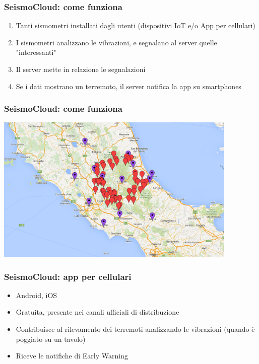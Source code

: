 \begin{frame}
	\frametitle{SeismoCloud: come funziona}
	
	\begin{enumerate}
		\item<1-> Tanti sismometri installati dagli utenti (dispositivi IoT e/o App per cellulari)
		\item<2-> I sismometri analizzano le vibrazioni, e segnalano al server quelle "interessanti"
		\item<3-> Il server mette in relazione le segnalazioni
		\item<4-> Se i dati mostrano un terremoto, il server notifica la app su smartphones
	\end{enumerate}
	
\end{frame}
\begin{frame}
	\frametitle{SeismoCloud: come funziona}

	\includegraphics[keepaspectratio=true,height=200pt]{simulazione}

\end{frame}
\begin{frame}
	\frametitle{SeismoCloud: app per cellulari}
	
	\begin{itemize}
		\item Android, iOS
		\item Gratuita, presente nei canali ufficiali di distribuzione
		\item Contribuisce al rilevamento dei terremoti analizzando le vibrazioni (quando è poggiato su un tavolo)
		\item Riceve le notifiche di Early Warning
	\end{itemize}
	
\end{frame}
